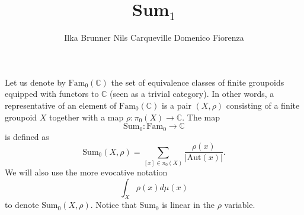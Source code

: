 \documentclass[12pt]{scrartcl}
\theoremstyle{definition}
\numberwithin{equation}{section}
\numberwithin{definition}{section}
\numberwithin{figure}{section}
\begin{document}
\title{Sum${}_1$}

\author{%
\!\!\!\!\!\!\!Ilka Brunner \quad
Nils Carqueville \quad
Domenico Fiorenza \quad
}

\date{}
\maketitle



Let us denote by $\mathrm{Fam}_0(\mathbb{C})$ the set of equivalence classes of finite groupoids equipped with functors to $\mathbb{C}$ (seen as a trivial category). In other words, a representative of an element of $\mathrm{Fam}_0(\mathbb{C})$ is a pair $(X,\rho)$ consisting of a finite groupoid $X$ together with a map $\rho\colon \pi_0(X)\to \mathbb{C}$.
The map 
\[
\mathrm{Sum}_0\colon \mathrm{Fam}_0\to \mathbb{C}
\]
is defined as
\[
\mathrm{Sum}_0(X,\rho)=\sum_{[x]\in \pi_0(X)}\frac{\rho(x)}{|\mathrm{Aut}(x)|}.
\]
We will also use the more evocative notation
\[
\int_X \rho(x) d\mu(x)
\]
to denote $\mathrm{Sum}_0(X,\rho)$. Notice that $\mathrm{Sum}_0$ is linear in the $\rho$ variable.
\end{document}
